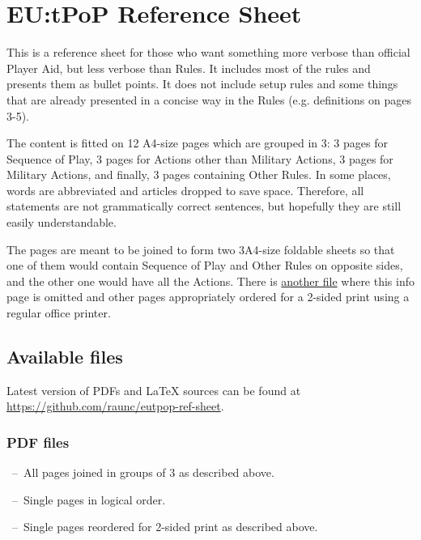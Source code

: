 \documentclass[10pt]{article}
\begin{document}
\thispagestyle{empty}

\section*{EU:tPoP Reference Sheet}

This is a reference sheet for those who want something more verbose than official Player Aid,
but less verbose than Rules.
It includes most of the rules and presents them as bullet points.
It does not include setup rules and some things that are already presented in a concise way
in the Rules (e.g. definitions on pages 3-5).


The content is fitted on 12 A4-size pages which are grouped in 3:
3 pages for Sequence of Play, 3 pages for Actions other than Military Actions,
3 pages for Military Actions, and finally, 3 pages containing Other Rules.
In some places, words are abbreviated and articles dropped to save space.
Therefore, all statements are not grammatically correct sentences, but hopefully they are still easily understandable.


The pages are meant to be joined to form two 3\texttimes A4-size foldable sheets so that
one of them would contain Sequence of Play and Other Rules on opposite sides,
and the other one would have all the Actions.
There is \href{https://github.com/raunc/eutpop-ref-sheet/blob/main/pdf/eutpop\_ref\_sheet\_print\_2\_sided.pdf}{another file}
where this info page is omitted and other pages appropriately ordered for a 2-sided print using a regular office printer.


\subsection*{Available files}

Latest version of PDFs and \LaTeX\xspace sources can be found at \href{https://github.com/raunc/eutpop-ref-sheet}{https://github.com/raunc/eutpop-ref-sheet}.

\subsubsection*{PDF files}
\begin{description}[itemsep=0pt, parsep=0pt, leftmargin=0pt, labelsep=0pt]
  \item[\href{https://github.com/raunc/eutpop-ref-sheet/blob/main/pdf/eutpop\_ref\_sheet.pdf}{eutpop\_ref\_sheet.pdf} \normal{(this file)}]
  ~--~All pages joined in groups of 3 as described above.
  \item[\href{https://github.com/raunc/eutpop-ref-sheet/blob/main/pdf/eutpop\_ref\_sheet\_print\_1\_sided.pdf}{eutpop\_ref\_sheet\_print\_1\_sided.pdf}]
  ~--~Single pages in logical order.
  \item[\href{https://github.com/raunc/eutpop-ref-sheet/blob/main/pdf/eutpop\_ref\_sheet\_print\_2\_sided.pdf}{eutpop\_ref\_sheet\_print\_2\_sided.pdf}]
  ~--~Single pages reordered for 2-sided print as described above.
\end{description}
\end{document}
